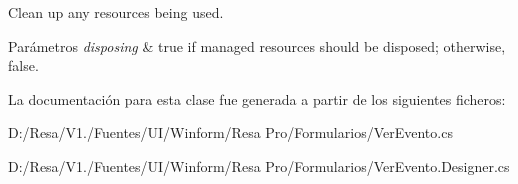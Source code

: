 Clean up any resources being used. 


\begin{DoxyParams}{Parámetros}
{\em disposing} & true if managed resources should be disposed; otherwise, false.\\
\hline
\end{DoxyParams}


La documentación para esta clase fue generada a partir de los siguientes ficheros\+:\begin{DoxyCompactItemize}
\item 
D\+:/\+Resa/\+V1./\+Fuentes/\+U\+I/\+Winform/\+Resa Pro/\+Formularios/Ver\+Evento.\+cs\item 
D\+:/\+Resa/\+V1./\+Fuentes/\+U\+I/\+Winform/\+Resa Pro/\+Formularios/Ver\+Evento.\+Designer.\+cs\end{DoxyCompactItemize}
